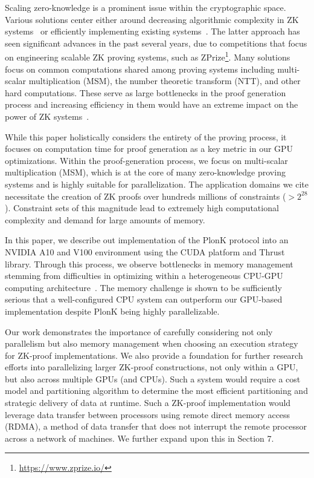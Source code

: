 \documentclass[sigconf]{acmart}
\begin{document}
Scaling zero-knowledge is a prominent issue within the cryptographic space. Various solutions center either around decreasing algorithmic complexity in ZK systems~\cite{zkTree23,ZKfolding} or efficiently implementing existing systems~\cite{MSMGPU22,GZKP,PipeZK}. The latter approach has seen significant advances in the past several years, due to competitions that
focus on engineering scalable ZK proving systems, such as ZPrize\footnote{\url{https://www.zprize.io/}}. Many solutions focus on common computations shared among proving systems including multi-scalar multiplication (MSM), the number theoretic transform (NTT), and other hard computations. These serve as large bottlenecks in the proof generation process and increasing efficiency in them would have an extreme impact on the power of ZK systems~\cite{PipeMSM}. 

While this paper holistically considers the entirety of the proving process, it focuses on computation time for proof generation as a key metric in our GPU optimizations. Within the proof-generation process, we focus on multi-scalar multiplication (MSM), which is at the core of many zero-knowledge proving systems and is highly suitable for parallelization. The application domains we cite necessitate the creation of ZK proofs over hundreds millions of constraints ($>2^{28}$). Constraint sets of this magnitude lead to extremely high computational complexity and demand for large amounts of memory. 



In this paper, we describe out implementation of the PlonK protocol into an NVIDIA A10 and V100 environment using the CUDA platform and Thrust library. Through this process, we observe bottlenecks in memory management stemming from difficulties in optimizing within a heterogeneous CPU-GPU computing architecture~\cite{Roofline}. The memory challenge is shown to be sufficiently serious that a well-configured CPU system can outperform our 
GPU-based implementation despite PlonK being highly parallelizable.

Our work demonstrates the importance of carefully considering not only parallelism but also memory management when choosing an execution strategy for ZK-proof implementations.
We also provide a foundation for further research efforts into parallelizing larger ZK-proof constructions, not only within a GPU, but also across multiple GPUs (and CPUs). Such a system would require a cost model and partitioning algorithm to determine the most efficient partitioning and strategic delivery of data at runtime. Such a ZK-proof implementation would leverage data transfer
between processors using remote direct memory access (RDMA), a method of data transfer that does not interrupt the remote processor across a network of machines. We further expand upon this in Section 7. 
\end{document}
